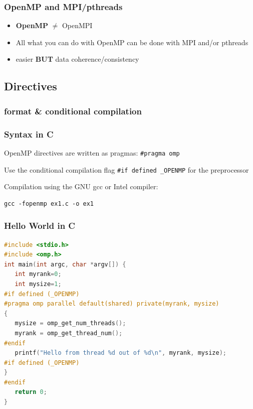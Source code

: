 \begin{frame}
  \frametitle{OpenMP and MPI/pthreads	}
  \begin{itemize}
  \item{\textbf{OpenMP} $\neq$ OpenMPI}
  \item{All what you can do with OpenMP can be done with MPI and/or pthreads}
  \item{easier \textbf{BUT} data coherence/consistency}
  \end{itemize}
\end{frame}

\subsection{Directives}

\subsubsection{format \& conditional compilation}

\begin{frame}[containsverbatim]
  \frametitle{Syntax in C}

  \begin{block}{}
    OpenMP directives are written as pragmas: \texttt{\#pragma omp}
  \end{block}

  \begin{block}{}
    Use the conditional compilation flag \texttt{\#if defined \_OPENMP} for the preprocessor
  \end{block}

  Compilation using the GNU gcc or Intel compiler:
\begin{verbatim}
gcc -fopenmp ex1.c -o ex1
\end{verbatim}
\end{frame}


\begin{frame}[containsverbatim]
  \frametitle{Hello World in C}

  \begin{lstlisting}[language=C++,frame=lines]
#include <stdio.h>
#include <omp.h>
int main(int argc, char *argv[]) {
   int myrank=0;
   int mysize=1;
#if defined (_OPENMP)
#pragma omp parallel default(shared) private(myrank, mysize)
{
   mysize = omp_get_num_threads();
   myrank = omp_get_thread_num();
#endif
   printf("Hello from thread %d out of %d\n", myrank, mysize);
#if defined (_OPENMP)
}
#endif
   return 0;
}
\end{lstlisting}
\end{frame}

